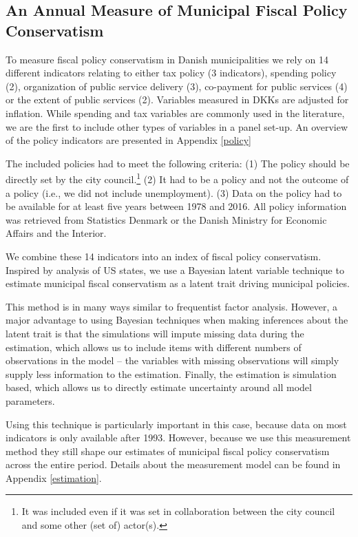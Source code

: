 \documentclass[a4paper,12pt]{article}
\begin{document}
\subsection*{An Annual Measure of Municipal Fiscal Policy Conservatism}

To measure fiscal policy conservatism in Danish municipalities we rely on 14 different indicators relating to either tax policy (3 indicators), spending policy (2), organization of public service delivery (3), co-payment for public services (4) or the extent of public services (2). Variables measured in DKKs are adjusted for inflation. While  spending and tax variables are commonly used in the literature, we are the first to include other types of variables in a panel set-up. An overview of the policy indicators are presented in Appendix \ref{policy}

The included policies had to meet the following criteria: (1) The policy should be directly set by the city council.\footnote{It was included even if it was set in collaboration between the city council and some other (set of) actor(s).} (2) It had to be a policy and not the outcome of a policy (i.e., we did not include unemployment). (3) Data on the policy had to be available for at least five years between 1978 and 2016. All policy information was retrieved from Statistics Denmark or the Danish Ministry for Economic Affairs and the Interior.

We combine these 14 indicators into an index of fiscal policy conservatism. Inspired by \cite{caughey2016dynamics} analysis of US states, we use a Bayesian latent variable technique to estimate municipal fiscal conservatism as a latent trait driving municipal policies. 

This method is in many ways similar to frequentist factor analysis. However, a major advantage to using Bayesian techniques when making inferences about the latent trait is that the simulations will impute missing data during the estimation, which allows us to include items with different numbers of observations in the model -- the variables with missing observations will simply supply less information to the estimation. Finally, the estimation is simulation based, which allows us to directly estimate uncertainty around all model parameters.

Using this technique is particularly important in this case, because data on most indicators is only available after 1993. However, because we use this measurement method they still shape our estimates of municipal fiscal policy conservatism across the entire period. Details about the measurement model can be found in Appendix \ref{estimation}. 
\end{document}

